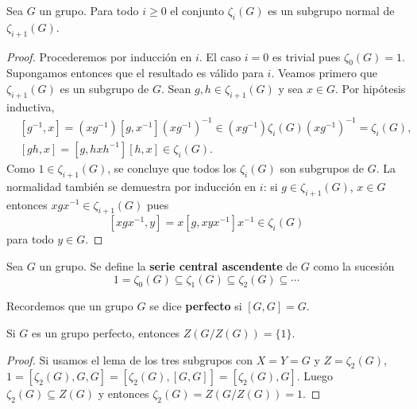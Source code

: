 \begin{lemma}
	\label{lemma:central_ascendente}
	Sea $G$ un grupo. Para todo $i\geq0$ el conjunto $\zeta_i(G)$ es un
	subgrupo normal de $\zeta_{i+1}(G)$. 
\end{lemma}

\begin{proof}
	Procederemos por inducción en $i$. El caso $i=0$ es trivial pues
	$\zeta_0(G)=1$.  Supongamos entonces que el resultado es válido para $i$.
	Veamos primero que $\zeta_{i+1}(G)$ es un subgrupo de $G$. 
	Sean $g,h\in \zeta_{i+1}(G)$ y sea $x\in G$. Por hipótesis inductiva,
	\begin{align*}
	&[g^{-1},x]=(xg^{-1})[g,x^{-1}](xg^{-1})^{-1}\in (xg^{-1})\zeta_i(G)(xg^{-1})^{-1}=\zeta_i(G),\\
	&[gh,x]=[g,hxh^{-1}][h,x]\in \zeta_{i}(G).
	\end{align*}
	Como $1\in\zeta_{i+1}(G)$, se concluye que todos los $\zeta_i(G)$ son
	subgrupos de $G$. La normalidad también se demuestra por inducción en $i$:
	si $g\in\zeta_{i+1}(G)$, $x\in G$ entonces $xgx^{-1}\in\zeta_{i+1}(G)$ pues 
	\[
	[xgx^{-1},y]=x[g,xyx^{-1}]x^{-1}\in\zeta_{i}(G)
	\]
	para todo $y\in G$.
\end{proof}


\begin{definition}
	Sea $G$ un grupo. Se define la \textbf{serie central ascendente} de $G$
	como la sucesión
	\[
		1=\zeta_0(G)\subseteq\zeta_1(G)\subseteq\zeta_2(G)\subseteq\cdots
	\]
\end{definition}


Recordemos que un grupo $G$ se dice \textbf{perfecto} si $[G,G]=G$.

\begin{theorem}[Gr\"un]
	\label{theorem:Grun}
	Si $G$ es un grupo perfecto, entonces $Z(G/Z(G))=\{1\}$. 
\end{theorem}

\begin{proof}
	Si usamos el lema de los tres subgrupos con $X=Y=G$ y $Z=\zeta_2(G)$, 
	$1=[\zeta_2(G),G,G]=[\zeta_2(G),[G,G]]=[\zeta_2(G),G]$. Luego 	
	$\zeta_2(G)\subseteq Z(G)$ y
	entonces $\zeta_2(G)=Z(G/Z(G))=1$. 
\end{proof}




